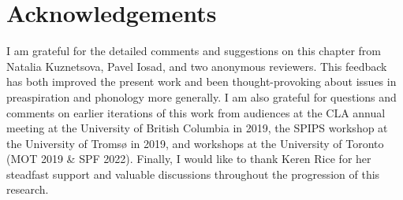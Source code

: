 \documentclass[output=paper,colorlinks,citecolor=brown]{langscibook}
\begin{document}
\section*{Acknowledgements}

I am grateful for the detailed comments and suggestions on this chapter from Natalia Kuznetsova, Pavel Iosad, and two anonymous reviewers. This feedback has both improved the present work and been thought-provoking about issues in preaspiration and phonology more generally.  I am also grateful for questions and comments on earlier iterations of this work from audiences at the CLA annual meeting at the University of British Columbia in 2019, the SPIPS workshop at the University of Tromsø in 2019, and workshops at the University of Toronto (MOT 2019 \& SPF 2022). Finally, I would like to thank Keren Rice for her steadfast support and valuable discussions throughout the progression of this research. 


\sloppy
\printbibliography[heading=subbibliography,notkeyword=this]
\end{document}
